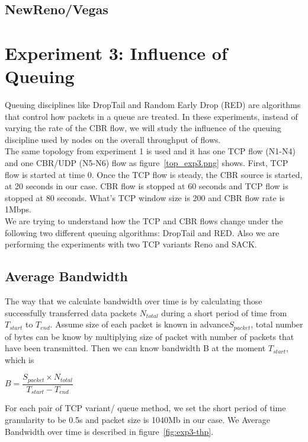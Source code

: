 \documentclass[10pt, conference]{lib/IEEEtran}
\begin{document}
\subsection{NewReno/Vegas}



\section{Experiment 3: Influence of Queuing}
Queuing disciplines like DropTail and Random Early Drop (RED) are algorithms that control how packets in a queue are treated. In these experiments, instead of varying the rate of the CBR flow, we will study the influence of the queuing discipline used by nodes on the overall throughput of flows.\\

The same topology from experiment 1 is used and it has one TCP flow (N1-N4) and one CBR/UDP (N5-N6) flow as figure~\ref{top_exp3.png} shows. First, TCP flow is started at time 0. Once the TCP flow is steady, the CBR source is started, at 20 seconds in our case. CBR flow is stopped at 60 seconds and TCP flow is stopped at 80 seconds. What's TCP window size is 200 and CBR flow rate is 1Mbps.\\

We are trying to understand how the TCP and CBR flows change under the following two different queuing algorithms: DropTail and RED. Also we are performing the experiments with two TCP variants Reno and SACK.\\

\subsection{Average Bandwidth}
The way that we calculate bandwidth over time is by calculating those successfully transferred data packets $N_{total}$ during a short period of time from $T_{start}$ to $T_{end}$. Assume size of each packet is known in advance$S_{packet}$, total number of bytes can be know by multiplying size of packet with number of packets that have been transmitted. Then we can know bandwidth B at the moment $T_{start}$, which is  
\begin{center}
    $B = \dfrac{S_{packet} \times N_{total}}{T_{start} - T_{end}}$
\end{center}
For each pair of TCP variant/ queue method, we set the short period of time granularity to be 0.5s and packet size is 1040Mb in our case. We Average Bandwidth over time is described in figure~\ref{fig:exp3-thp}.\\
\end{document}
